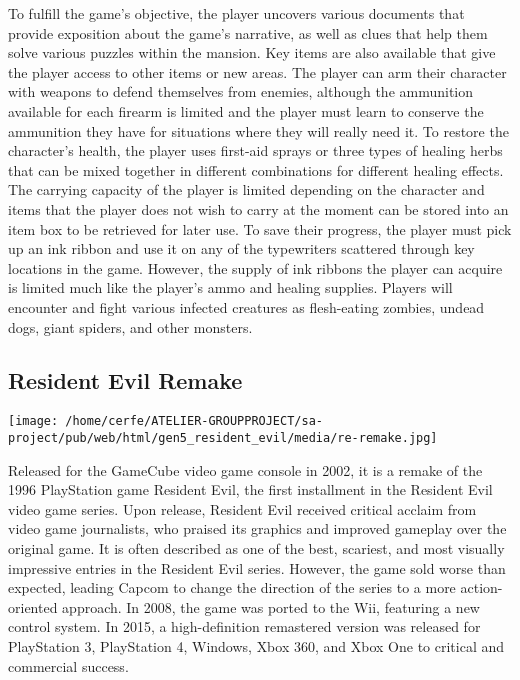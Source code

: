 \documentclass[a4paper,10pt]{book}
\begin{document}
            To fulfill the game's objective, the player uncovers various documents that provide exposition about the game's narrative, as well as clues that help them solve various puzzles within the mansion. 
            Key items are also available that give the player access to other items or new areas. 
            The player can arm their character with weapons to defend themselves from enemies, although the ammunition available for each firearm is limited and the player must learn to conserve the ammunition they have for situations where they will really need it. 
            To restore the character's health, the player uses first-aid sprays or three types of healing herbs that can be mixed together in different combinations for different healing effects. 
            The carrying capacity of the player is limited depending on the character and items that the player does not wish to carry at the moment can be stored into an item box to be retrieved for later use. 
            To save their progress, the player must pick up an ink ribbon and use it on any of the typewriters scattered through key locations in the game. 
            However, the supply of ink ribbons the player can acquire is limited much like the player's ammo and healing supplies. 
            Players will encounter and fight various infected creatures as flesh-eating zombies, undead dogs, giant spiders, and other monsters.
         
 \subsection{Resident Evil Remake }
 \texttt{[image: /home/cerfe/ATELIER-GROUPPROJECT/sa-project/pub/web/html/gen5\_resident\_evil/media/re-remake.jpg]}
 
            Released for the GameCube video game console in 2002, it is a remake of the 1996 PlayStation game Resident Evil, the first installment in the Resident Evil video game series.
            Upon release, Resident Evil received critical acclaim from video game journalists, who praised its graphics and improved gameplay over the original game. 
            It is often described as one of the best, scariest, and most visually impressive entries in the Resident Evil series. 
            However, the game sold worse than expected, leading Capcom to change the direction of the series to a more action-oriented approach. In 2008, the game was ported to the Wii, featuring a new control system. 
            In 2015, a high-definition remastered version was released for PlayStation 3, PlayStation 4, Windows, Xbox 360, and Xbox One to critical and commercial success.
         
\end{document}
